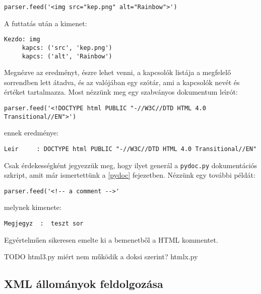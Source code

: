 \begin{Verbatim}[fontsize=\small]
parser.feed('<img src="kep.png" alt="Rainbow">')
\end{Verbatim}

\noindent A futtat\'as ut\'an a kimenet:

\begin{Verbatim}[fontsize=\small]
Kezdo: img
     kapcs: ('src', 'kep.png')
     kapcs: ('alt', 'Rainbow')
\end{Verbatim}

\noindent Megn\'ezve az eredm\'enyt, \'eszre lehet venni, a kapcsol\'ok list\'aja a megfelel\H{o} 
sorrendben lett \'atadva, \'es az val\'oj\'aban egy sz\'ot\'ar, ami a kapcsol\'ok nev\'et \'es 
\'ert\'eket tartalmazza. Most n\'ezz\"unk meg egy szabv\'anyos dokumentum le\'{\i}r\'ot:

\begin{Verbatim}[fontsize=\small]
parser.feed('<!DOCTYPE html PUBLIC "-//W3C//DTD HTML 4.0 Transitional//EN">')
\end{Verbatim}

\noindent ennek eredm\'enye:

\begin{Verbatim}[fontsize=\small]
Leir     : DOCTYPE html PUBLIC "-//W3C//DTD HTML 4.0 Transitional//EN"
\end{Verbatim}

\noindent Csak \'erdekess\'egk\'ent jegyezz\"uk meg, hogy ilyet gener\'al a {\tt pydoc.py} 
dokument\'aci\'os szkript, amit m\'ar ismertett\"unk a \ref{pydoc} fejezetben. N\'ezz\"unk 
egy tov\'abbi p\'eld\'at:

\begin{Verbatim}[fontsize=\small]
parser.feed('<!-- a comment -->'
\end{Verbatim}

\noindent melynek kimenete:

\begin{Verbatim}[fontsize=\small]
Megjegyz  :  teszt sor
\end{Verbatim}

\noindent Egy\'ertelm\H{u}en sikeresen emelte ki a bemenetb\H{o}l a HTML kommentet.

TODO html3.py mi\'ert nem m\H{u}k\"odik a doksi szerint? htmlx.py

\subsection{XML \'allom\'anyok feldolgoz\'asa}

